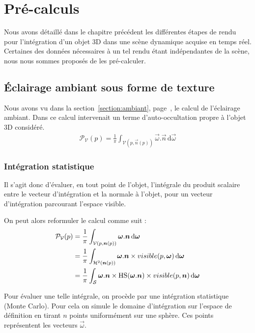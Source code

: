 \documentclass[10pt,a4paper,twoside, twocolumn]{report}
\begin{document}
\iftwocolumn \twocolumn \else \onecolumn \fi


\chapter{Pré-calculs}

Nous avons détaillé dans le chapitre précédent les différentes étapes de rendu pour l'intégration d'un objet 3D dans une scène dynamique acquise en temps réel. Certaines des données nécessaires à un tel rendu étant indépendantes de la scène, nous nous sommes proposés de les pré-calculer. 

\section{Éclairage ambiant sous forme de texture}\label{section:precomputation_ambiant}

Nous avons vu dans la section~\ref{section:ambiant}, page~\pageref{section:ambiant}, le calcul de l'éclairage ambiant. Dans ce calcul intervenait un terme d'auto-occultation propre à l'objet 3D considéré.
\begin{align}
	\mathcal P_{\mathcal V}(p) = \frac{1}{\pi}\int_{\mathcal V(p, \vec n(p))}\vec\omega.\vec n\, \mathrm d\vec\omega
\end{align}

\subsection{Intégration statistique}
Il s’agit donc d'évaluer, en tout point de l'objet, l’intégrale du produit scalaire entre le vecteur d’intégration et la normale à l'objet, pour un vecteur d’intégration parcourant l’espace visible.

On peut alors reformuler le calcul comme suit :
\begin{align}
\mathcal P_{\mathcal V}(p)	&= \frac{1}{\pi}\int_{\mathcal V(p, \vec n(p))}\vec\omega.\vec n\, \mathrm d\vec\omega \notag\\
														&= \frac{1}{\pi}\int_{\mathcal H^2(\vec n(p))}\vec\omega.\vec n\times visible(p, \vec \omega)\, \mathrm d\vec\omega \notag\\
														&= \frac{1}{\pi}\int_{\mathcal S}\vec\omega.\vec n\times \Hs(\vec \omega.\vec n)\times visible(p, \vec n)\, \mathrm d\vec\omega
\end{align}

Pour évaluer une telle intégrale, on procède par une intégration statistique (Monte Carlo). Pour cela on simule le domaine d'intégration sur l'espace de définition en tirant $n$ points uniformément sur une sphère. Ces points représentent les vecteurs $\vec\omega$.
\end{document}
